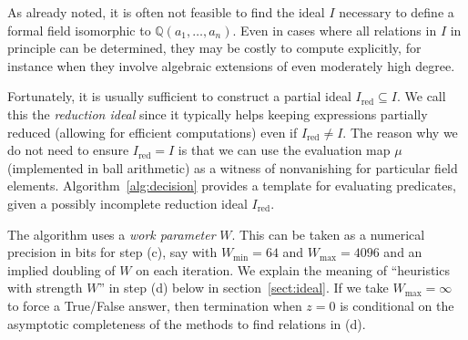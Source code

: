 \documentclass[11pt,a4paper]{article}
\begin{document}
\label{sect:incompleteideal}

As already noted, it is often not feasible
to find the ideal $I$ necessary to define
a formal field isomorphic to $\mathbb{Q}(a_1,\ldots,a_n)$.
Even in cases where all relations in $I$ in principle can be determined,
they may be costly to compute explicitly,
for instance when they involve algebraic
extensions of even moderately high degree.

Fortunately, it is usually sufficient to construct a partial ideal $I_{\text{red}} \subseteq I$.
We call this the \emph{reduction ideal}
since it typically helps keeping expressions partially reduced
(allowing for efficient computations) even if $I_{\text{red}} \ne I$.
The reason why we do not need to ensure $I_{\text{red}} = I$ is that we can use
the evaluation map $\mu$ (implemented in ball arithmetic)
as a witness of nonvanishing for particular field elements.
Algorithm~\ref{alg:decision} provides
a template for evaluating predicates,
given a possibly incomplete reduction ideal $I_{\text{red}}$.

The algorithm uses a \emph{work parameter} $W$. This can
be taken as a numerical precision in bits for step (c), say with
$W_{\text{min}} = 64$ and $W_{\text{max}} = 4096$
and an implied doubling of $W$ on each iteration.
We explain the meaning of ``heuristics with strength $W$'' in step (d) below in section~\ref{sect:ideal}.
If we take $W_{\text{max}} = \infty$ to force a True/False answer,
then termination when $z = 0$ is conditional
on the asymptotic completeness of the methods to find relations in (d).
\end{document}
